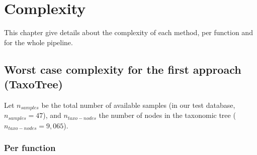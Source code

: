 \documentclass{report}
\begin{document}
\chapter{Complexity}

This chapter give details about the complexity of each method, per function and for the whole pipeline.

\section{Worst case complexity for the first approach (TaxoTree)}

Let $n_{samples}$ be the total number of available samples (in our test database, $n_{samples} = 47$), and $n_{taxo-nodes}$ the number of nodes in the taxonomic tree ($n_{taxo-nodes} = 9,065$).

\subsection{Per function}
\end{document}
